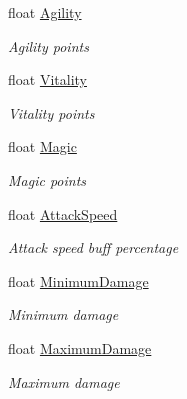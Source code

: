 \begin{DoxyCompactItemize}
float \hyperlink{class_hel_project_1_1_features_1_1_feature_collection_a6254f82bffd41e3ca3beacf1928bb409}{Agility}
\begin{DoxyCompactList}\small\item\em Agility points \end{DoxyCompactList}\item 
float \hyperlink{class_hel_project_1_1_features_1_1_feature_collection_a27719b073c6acce4f5faba5a437e1a70}{Vitality}
\begin{DoxyCompactList}\small\item\em Vitality points \end{DoxyCompactList}\item 
float \hyperlink{class_hel_project_1_1_features_1_1_feature_collection_a7e5d56ee0fb50efbc2078002c01ff704}{Magic}
\begin{DoxyCompactList}\small\item\em Magic points \end{DoxyCompactList}\item 
float \hyperlink{class_hel_project_1_1_features_1_1_feature_collection_a0e3d5ed05e9d748eaa03e861ca0c6470}{Attack\+Speed}
\begin{DoxyCompactList}\small\item\em Attack speed buff percentage \end{DoxyCompactList}\item 
float \hyperlink{class_hel_project_1_1_features_1_1_feature_collection_ab8e635daa04259ac6ac50f1c78133fc2}{Minimum\+Damage}
\begin{DoxyCompactList}\small\item\em Minimum damage \end{DoxyCompactList}\item 
float \hyperlink{class_hel_project_1_1_features_1_1_feature_collection_aeb58ea21cbca8600e2a4a65ab0399d0d}{Maximum\+Damage}
\begin{DoxyCompactList}\small\item\em Maximum damage \end{DoxyCompactList}\item 

\end{DoxyCompactItemize}
